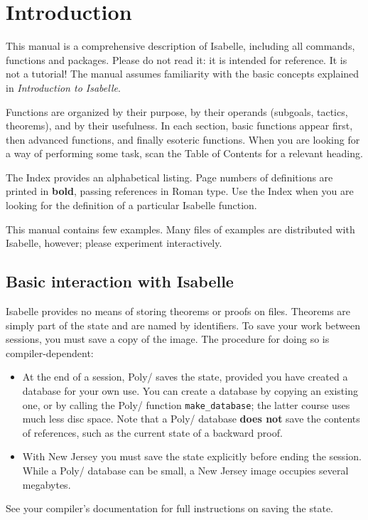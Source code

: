 \maketitle 
{} \tableofcontents \clearfirst

\chapter{Introduction} 
This manual is a comprehensive description of Isabelle, including all
commands, functions and packages.  Please do not read it: it is intended
for reference.  It is not a tutorial!  The manual assumes
familiarity with the basic concepts explained in {\em Introduction to
Isabelle}.

Functions are organized by their purpose, by their operands (subgoals,
tactics, theorems), and by their usefulness.  In each section, basic
functions appear first, then advanced functions, and finally esoteric
functions.  When you are looking for a way of performing some task, scan
the Table of Contents for a relevant heading.

The Index provides an alphabetical listing.  Page numbers of definitions
are printed in {\bf bold}, passing references in Roman type.  Use the Index
when you are looking for the definition of a particular Isabelle function.

This manual contains few examples.  Many files of examples are distributed
with Isabelle, however; please experiment interactively.


\section{Basic interaction with Isabelle}
Isabelle provides no means of storing theorems or proofs on files.
Theorems are simply part of the \ML{} state and are named by \ML{}
identifiers.  To save your work between sessions, you must save a copy of
the \ML{} image.  The procedure for doing so is compiler-dependent:
\begin{itemize}
\item At the end of a session, Poly/\ML{} saves the state, provided you have
created a database for your own use.  You can create a database by copying
an existing one, or by calling the Poly/\ML{} function {\tt make_database};
the latter course uses much less disc space.  Note that a Poly/\ML{}
database {\bf does not} save the contents of references, such as the
current state of a backward proof.

\item With New Jersey \ML{} you must save the state explicitly before
ending the session.  While a Poly/\ML{} database can be small, a New Jersey
image occupies several megabytes.
\end{itemize}
See your \ML{} compiler's documentation for full instructions on saving the
state.

